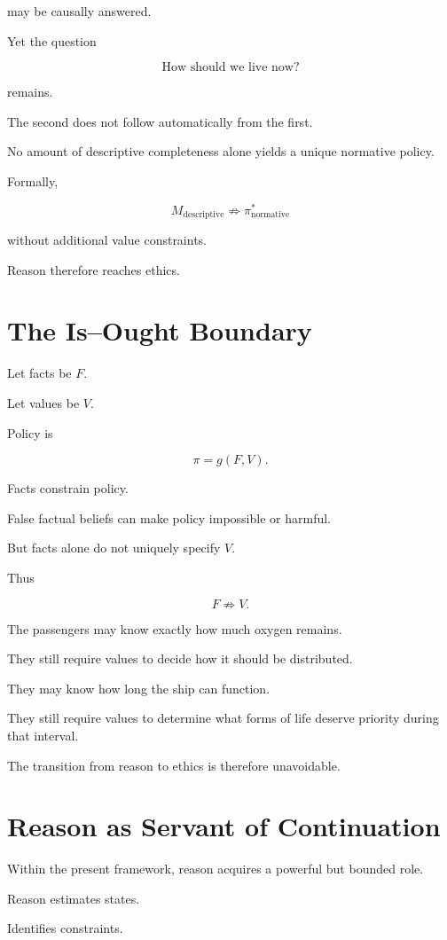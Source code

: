 \documentclass[11pt,oneside]{book}
\theoremstyle{definition}
\theoremstyle{remark}
\begin{document}
may be causally answered.

Yet the question

\[
\text{How should we live now?}
\]

remains.

The second does not follow automatically from the first.

No amount of descriptive completeness alone yields a unique normative policy.

Formally,

\[
M_{\mathrm{descriptive}}
\not\Rightarrow
\pi^\ast_{\mathrm{normative}}
\]

without additional value constraints.

Reason therefore reaches ethics.

\section{The Is--Ought Boundary}

Let facts be \(F\).

Let values be \(V\).

Policy is

\[
\pi
=
g(F,V).
\]

Facts constrain policy.

False factual beliefs can make policy impossible or harmful.

But facts alone do not uniquely specify \(V\).

Thus

\[
F\not\Rightarrow V.
\]

The passengers may know exactly how much oxygen remains.

They still require values to decide how it should be distributed.

They may know how long the ship can function.

They still require values to determine what forms of life deserve priority during that interval.

The transition from reason to ethics is therefore unavoidable.

\section{Reason as Servant of Continuation}

Within the present framework, reason acquires a powerful but bounded role.

Reason estimates states.

Identifies constraints.
\end{document}
